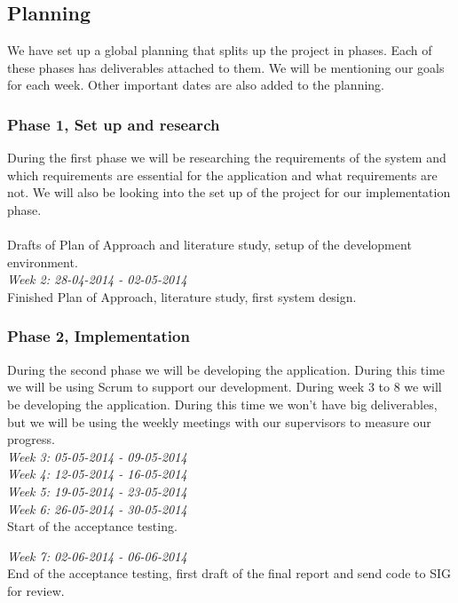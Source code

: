 \subsection*{Planning}
We have set up a global planning that splits up the project in phases.
Each of these phases has deliverables attached to them.
We will be mentioning our goals for each week.
Other important dates are also added to the planning.

\subsubsection*{Phase 1, Set up and research}
During the first phase we will be researching the requirements of the system and which requirements are essential for the application and what requirements are not.
We will also be looking into the set up of the project for our implementation phase.\\

\\
Drafts of Plan of Approach and literature study, setup of the development environment.\\
\noindent\emph{Week 2: 28-04-2014 - 02-05-2014}\\
Finished Plan of Approach, literature study, first system design.

\subsubsection*{Phase 2, Implementation}
During the second phase we will be developing the application.
During this time we will be using Scrum to support our development.
During week 3 to 8 we will be developing the application.
During this time we won't have big deliverables, but we will be using the weekly meetings with our supervisors to measure our progress.\\

\noindent\emph{Week 3: 05-05-2014 - 09-05-2014}\\

\noindent\emph{Week 4: 12-05-2014 - 16-05-2014}\\

\noindent\emph{Week 5: 19-05-2014 - 23-05-2014}\\

\noindent\emph{Week 6: 26-05-2014 - 30-05-2014}\\
Start of the acceptance testing.

\noindent\emph{Week 7: 02-06-2014 - 06-06-2014}\\
End of the acceptance testing, first draft of the final report and send code to SIG for review.

